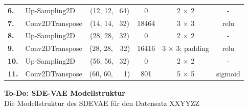 \documentclass[12pt]{article}
\begin{document}
\begin{table}[htb!]
\begin{center}
\begin{tabular}{llcccc}
				\textbf{6.}	&Up-Sampling2D	& (12, 12, \ 64)	& 0		& 2 $\times$ 2 	&- \\
				\textbf{7.}	&Conv2DTranspose& (14, 14, \ 32)	& 18464		& 3 $\times$ 3 			&relu \\
				\textbf{8.}	&Up-Sampling2D	& (28, 28, \ 32)	& 0	& 2 $\times$ 2 			&- \\
				\textbf{9.}	&Conv2DTranspose& (28, 28,\ \ 32)	& 16416  	& 3 $\times$ 3; padding 			&relu \\
				\textbf{10.}&Up-Sampling2D	& (56, 56, \ 32)	& 0	& 2 $\times$ 2 			&- \\
				\textbf{11.}&Conv2DTranspose& (60, 60,\ \ \ 1)	& 801  	& 5 $\times$ 5 &sigmoid \\
				\bottomrule
				\bottomrule
			\end{tabular}
		\end{center}
	\end{table}
	\newpage
	\textbf{To-Do: SDE-VAE Modellstruktur}\\
	Die Modellstruktur des SDEVAE für den Datensatz XXYYZZ
	\newpage
\end{document}
